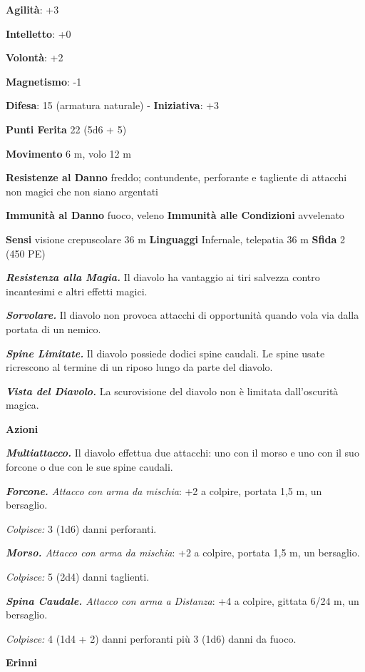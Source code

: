 \begin{multicols}{2}
\textbf{Agilità}: +3

\textbf{Intelletto}: +0

\textbf{Volontà}: +2

\textbf{Magnetismo}: -1

\textbf{Difesa}: 15 (armatura naturale) - \textbf{Iniziativa}: +3

\textbf{Punti Ferita} 22 (5d6 + 5)

\textbf{Movimento} 6 m, volo 12 m

\textbf{Resistenze al Danno} freddo; contundente, perforante e tagliente
di attacchi non magici che non siano argentati

\textbf{Immunità al Danno} fuoco, veleno \textbf{Immunità alle
Condizioni} avvelenato

\textbf{Sensi} visione crepuscolare 36 m
\textbf{Linguaggi} Infernale, telepatia 36 m \textbf{Sfida} 2 (450 PE)

\emph{\textbf{Resistenza alla Magia.}} Il diavolo ha vantaggio ai tiri
salvezza contro incantesimi e altri effetti magici.

\emph{\textbf{Sorvolare.}} Il diavolo non provoca attacchi di
opportunità quando vola via dalla portata di un nemico.

\emph{\textbf{Spine Limitate.}} Il diavolo possiede dodici spine
caudali. Le spine usate ricrescono al termine di un riposo lungo da
parte del diavolo.

\emph{\textbf{Vista del Diavolo.}} La scurovisione del diavolo non è
limitata dall'oscurità magica.

\textbf{Azioni}

\emph{\textbf{Multiattacco.}} Il diavolo effettua due attacchi: uno con
il morso e uno con il suo forcone o due con le sue spine caudali.

\emph{\textbf{Forcone.} Attacco con arma da mischia}: +2 a colpire,
portata 1,5 m, un bersaglio.

\emph{Colpisce:} 3 (1d6) danni perforanti.

\emph{\textbf{Morso.} Attacco con arma da mischia}: +2 a colpire,
portata 1,5 m, un bersaglio.

\emph{Colpisce:} 5 (2d4) danni taglienti.

\emph{\textbf{Spina Caudale.} Attacco con arma a Distanza}: +4 a
colpire, gittata 6/24 m, un bersaglio.

\emph{Colpisce:} 4 (1d4 + 2) danni perforanti più 3 (1d6) danni da
fuoco.

\textbf{Erinni}


\end{multicols}
